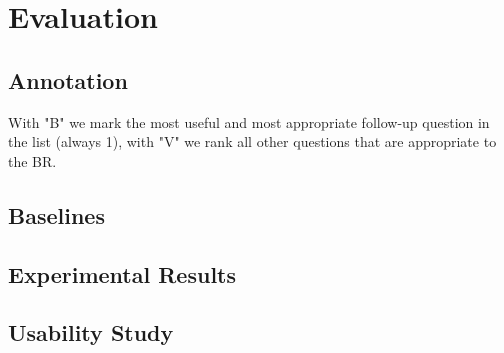 \section{Evaluation}

\subsection{Annotation}

With "B" we mark the most useful and most appropriate follow-up question in the list (always 1), with "V" we rank all other questions that are appropriate to the BR.

\subsection{Baselines}

\subsection{Experimental Results}

\subsection{Usability Study}

